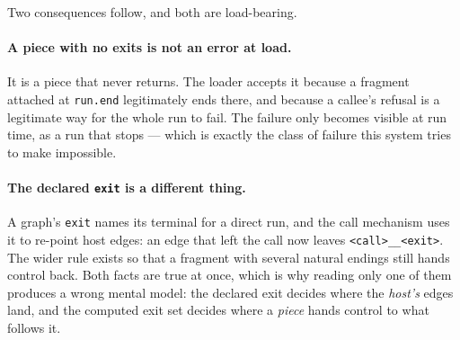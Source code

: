 \begin{center}
\end{center}

Two consequences follow, and both are load-bearing.

\paragraph{A piece with no exits is not an error at load.} It is a piece that never returns. The
loader accepts it because a fragment attached at \texttt{run.end} legitimately ends there, and
because a callee's refusal is a legitimate way for the whole run to fail. The failure only becomes
visible at run time, as a run that stops --- which is exactly the class of failure this system tries
to make impossible.

\paragraph{The declared \texttt{exit} is a different thing.} A graph's \texttt{exit} names its
terminal for a direct run, and the call mechanism uses it to re-point host edges: an edge that left
the call now leaves \texttt{<call>\_\_<exit>}. The wider rule exists so that a fragment with several
natural endings still hands control back. Both facts are true at once, which is why reading only one
of them produces a wrong mental model: the declared exit decides where the \emph{host's} edges land,
and the computed exit set decides where a \emph{piece} hands control to what follows it.

